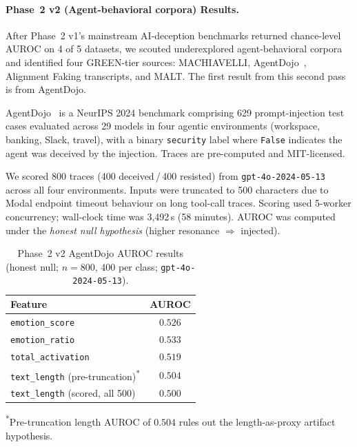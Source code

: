 \documentclass{article}
\begin{document}
\paragraph{Phase~2 v2 (Agent-behavioral corpora) Results.}
After Phase~2 v1's mainstream AI-deception benchmarks returned
chance-level AUROC on 4 of 5 datasets, we scouted underexplored
agent-behavioral corpora and identified four GREEN-tier sources:
MACHIAVELLI, AgentDojo~\cite{debenedetti2024agentdojo}, Alignment
Faking transcripts, and MALT. The first result from this second pass
is from AgentDojo.

AgentDojo~\cite{debenedetti2024agentdojo} is a NeurIPS 2024 benchmark
comprising 629 prompt-injection test cases evaluated across 29 models in
four agentic environments (workspace, banking, Slack, travel), with a
binary \texttt{security} label where \texttt{False} indicates the agent
was deceived by the injection. Traces are pre-computed and
MIT-licensed.

We scored 800 traces (400 deceived\,/\,400 resisted) from
\texttt{gpt-4o-2024-05-13} across all four environments. Inputs were
truncated to 500 characters due to Modal endpoint timeout behaviour on
long tool-call traces. Scoring used 5-worker concurrency; wall-clock
time was 3{,}492\,s (58 minutes). AUROC was computed under the
\emph{honest null hypothesis} (higher resonance $\Rightarrow$ injected).

\begin{table}[h]
\centering
\caption{Phase~2 v2 AgentDojo AUROC results (honest null; $n = 800$,
  400 per class; \texttt{gpt-4o-2024-05-13}).}
\label{tab:phase2v2_agentdojo}
\small
\begin{tabular}{lc}
\toprule
\textbf{Feature} & \textbf{AUROC} \\
\midrule
\texttt{emotion\_score}                                  & $0.526$ \\
\texttt{emotion\_ratio}                                  & $0.533$ \\
\texttt{total\_activation}                               & $0.519$ \\
\texttt{text\_length} (pre-truncation)\textsuperscript{*} & $0.504$ \\
\texttt{text\_length} (scored, all 500)                  & $0.500$ \\
\bottomrule
\end{tabular}
\vspace{2pt}
{\footnotesize \textsuperscript{*}Pre-truncation length AUROC of $0.504$
rules out the length-as-proxy artifact hypothesis.}
\end{table}
\end{document}
